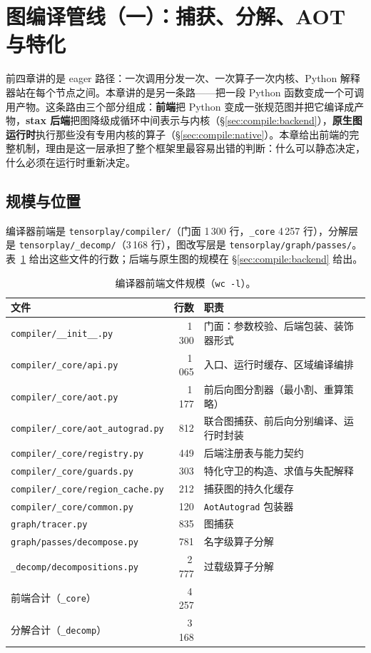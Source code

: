 \section{图编译管线（一）：捕获、分解、AOT 与特化}
\label{sec:compile:frontend}

前四章讲的是 eager 路径：一次调用分发一次、一次算子一次内核、Python 解释器站在每个节点之间。本章讲的是另一条路——把一段 Python 函数变成一个可调用产物。这条路由三个部分组成：\textbf{前端}把 Python 变成一张规范图并把它编译成产物，\textbf{stax 后端}把图降级成循环中间表示与内核（\S\ref{sec:compile:backend}），\textbf{原生图运行时}执行那些没有专用内核的算子（\S\ref{sec:compile:native}）。本章给出前端的完整机制，理由是这一层承担了整个框架里最容易出错的判断：什么可以静态决定，什么必须在运行时重新决定。

\subsection{规模与位置}

编译器前端是 \texttt{tensorplay/compiler/}（门面 1\,300 行，\texttt{\_core} 4\,257 行），分解层是 \texttt{tensorplay/\_decomp/}（3\,168 行），图改写层是 \texttt{tensorplay/graph/passes/}。表~\ref{tab:fe:files} 给出这些文件的行数；后端与原生图的规模在 \S\ref{sec:compile:backend} 给出。

\begin{table}[H]
\centering
\caption{编译器前端文件规模（\texttt{wc -l}）。}
\label{tab:fe:files}
\small
\begin{tabular}{lrl}
\toprule
文件 & 行数 & 职责 \\
\midrule
\texttt{compiler/\_\_init\_\_.py} & 1\,300 & 门面：参数校验、后端包装、装饰器形式 \\
\texttt{compiler/\_core/api.py} & 1\,065 & 入口、运行时缓存、区域编译编排 \\
\texttt{compiler/\_core/aot.py} & 1\,177 & 前后向图分割器（最小割、重算策略） \\
\texttt{compiler/\_core/aot\_autograd.py} & 812 & 联合图捕获、前后向分别编译、运行时封装 \\
\texttt{compiler/\_core/registry.py} & 449 & 后端注册表与能力契约 \\
\texttt{compiler/\_core/guards.py} & 303 & 特化守卫的构造、求值与失配解释 \\
\texttt{compiler/\_core/region\_cache.py} & 212 & 捕获图的持久化缓存 \\
\texttt{compiler/\_core/common.py} & 120 & \texttt{AotAutograd} 包装器 \\
\texttt{graph/tracer.py} & 835 & 图捕获 \\
\texttt{graph/passes/decompose.py} & 781 & 名字级算子分解 \\
\texttt{\_decomp/decompositions.py} & 2\,777 & 过载级算子分解 \\
\midrule
前端合计（\texttt{\_core}） & 4\,257 & \\
分解合计（\texttt{\_decomp}） & 3\,168 & \\
\bottomrule
\end{tabular}
\end{table}

